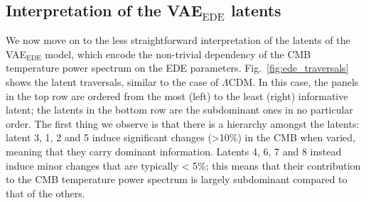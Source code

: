 \documentclass[aps, prd, reprint, superscriptaddress, nofootinbib, bibnotes]{revtex4-2}
\begin{document}
\subsection{Interpretation of the VAE$_\mathrm{EDE}$ latents}
\label{sec:latentinterpretation}
We now move on to the less straightforward interpretation of the latents of the VAE$_\mathrm{EDE}$ model, which encode the non-trivial dependency of the CMB temperature power spectrum on the EDE parameters. Fig.~\ref{fig:ede_traversals} shows the latent traversals, similar to the case of $\Lambda$CDM. In this case, the panels in the top row are ordered from the most (left) to the least (right) informative latent; the latents in the bottom row are the subdominant ones in no particular order. The first thing we observe is that there is a hierarchy amongst the latents: latent 3, 1, 2 and 5 induce significant changes (>10\%) in the CMB when varied, meaning that they carry dominant information. Latents 4, 6, 7 and 8 instead induce minor changes that are typically < 5\%; this means that their contribution to the CMB temperature power spectrum is largely subdominant compared to that of the others.
\end{document}
